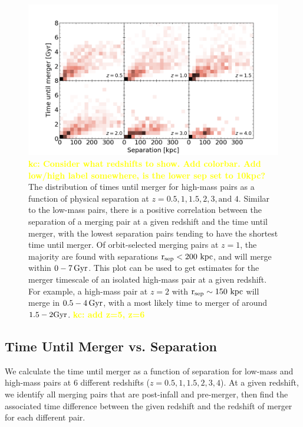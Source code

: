 \documentclass[twocolumn,linenumbers]{aastex631}
\newcommand{\kc}[1]{\textcolor{yellow}{\textbf{kc: #1}} }
\newcommand{\rsep}{\ensuremath{\rm r_{sep}}}
\begin{document}
\begin{figure}[htb]
    \begin{center}
    \includegraphics[width=\textwidth]{plots/bet-on-it/3_Timevssephigh-2d.png}
    \caption{\kc{Consider what redshifts to show. Add colorbar. Add low/high label somewhere, is the lower sep set to 10kpc?} The distribution of times until merger for high-mass pairs as a function of physical separation at $z=0.5,1,1.5,2,3,\mbox{and }4$.
    Similar to the low-mass pairs, there is a positive correlation between the separation of a merging pair at a given redshift and the time until merger, with the lowest separation pairs tending to have the shortest time until merger.
    Of orbit-selected merging pairs at $z=1$, the majority are found with separations $\rsep<200\,\kpc$, and will merge within $0-7\, \mathrm{Gyr}$. 
    This plot can be used to get estimates for the merger timescale of an isolated high-mass pair at a given redshift. 
    For example, a high-mass pair at $z=2$ with $\rsep\sim 150\,\kpc$ will merge in $0.5-4\,\mathrm{Gyr}$, with a most likely time to merger of around $1.5-2\mathrm{Gyr}$.
    \kc{add z=5, z=6}
    }
    \label{fig:timevssep-high}
    \end{center}
\end{figure}

\subsection{Time Until Merger vs. Separation}
We calculate the time until merger as a function of separation for low-mass and high-mass pairs at 6 different redshifts ($z=0.5,1,1.5,2,3,4$). 
At a given redshift, we identify all merging pairs that are post-infall and pre-merger, then find the associated time difference between the given redshift and the redshift of merger for each different pair.
\end{document}
